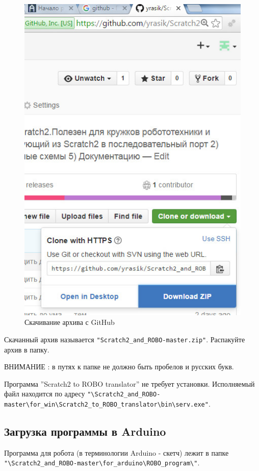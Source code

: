 \begin{figure}[H]\center
  \captionsetup{singlelinecheck=true} %
  \includegraphics*[scale=0.7]{about/images/guthub_download}
  \caption{Скачивание архива с GitHub} \label{p:guthub_download}
\end{figure}

Скачанный архив называется \verb|"Scratch2_and_ROBO-master.zip"|. Распакуйте архив в папку.

ВНИМАНИЕ : в путях к папке не должно быть пробелов и русских букв.

Программа ''Scratch2 to ROBO translator'' не требует установки. Исполняемый файл находится по адресу \verb|"\Scratch2_and_ROBO-master\for_win\Scratch2_to_ROBO_translator\bin\serv.exe"|. 


\subsection{Загрузка  программы в Arduino}

Программа для робота (в терминологии Arduino - скетч) лежит в папке \\ \verb|"\Scratch2_and_ROBO-master\for_arduino\ROBO_program\"|.

